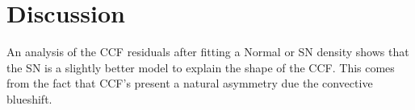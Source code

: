 \documentclass[11pt, oneside]{article}
\begin{document}


\section{Discussion} \label{sec:discu}

An analysis of the CCF residuals after fitting a Normal or SN density shows that the SN is a slightly better model to explain the shape of the CCF. This comes from the fact that CCF's present a natural asymmetry due the convective blueshift.
\end{document}
